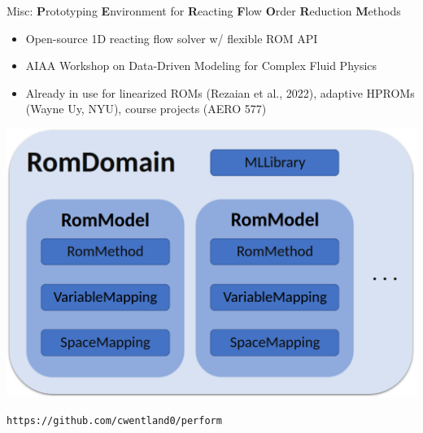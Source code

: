 \documentclass[]{beamer}
\begin{document}
\begin{frame}{\small{Misc: \textbf{P}rototyping \textbf{E}nvironment for \textbf{R}eacting \textbf{F}low \textbf{O}rder \textbf{R}eduction \textbf{M}ethods}}
	\begin{itemize}
		\small
		\item Open-source 1D reacting flow solver w/ flexible ROM API
		\item AIAA Workshop on Data-Driven Modeling for Complex Fluid Physics
		\item Already in use for linearized ROMs (Rezaian et al., 2022), adaptive HPROMs (Wayne Uy, NYU), course projects (AERO 577)
		\normalsize
	\end{itemize}
	\vspace{1em}
	\begin{minipage}{0.4\linewidth}
		\includegraphics[width=0.99\linewidth]{misc/performAPI.png}
	\end{minipage}
	\begin{minipage}{0.59\linewidth}
	\end{minipage}

	\vspace{1.5em}
	\centering
	\texttt{https://github.com/cwentland0/perform}
\end{frame}
\end{document}
